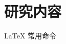 \documentclass[10pt,aspectratio=43,mathserif]{beamer}
\def\cmd#1{\texttt{\color{red}\footnotesize $\backslash$#1}}
\def\env#1{\texttt{\color{blue}\footnotesize #1}}
\begin{document}
\section{研究内容}

\begin{frame}[fragile]{\LaTeX{} 常用命令}
\end{frame}
\end{document}
